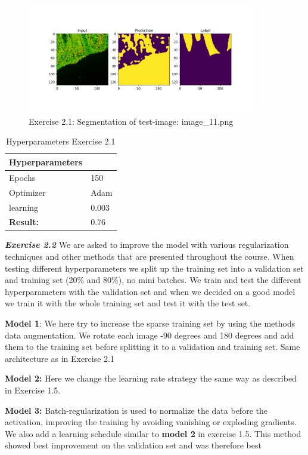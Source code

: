 \documentclass[a4paper,10pt]{article}
\begin{document}
\begin{figure}[ht!]
\centering
\includegraphics[width=100mm]{figures/assignment_3/segmentation_worst.png}
\caption{Exercise 2.1: Segmentation of test-image: image\_11.png}
\label{fig:worst}
\end{figure}

\begin{table}[ht!]
\centering
\begin{tabular}{ll}\hline 
 \textbf{Hyperparameters}&    \\ \hline
 Epochs&  150 \\ 
 Optimizer& Adam  \\
 learning& 0.003 \\ \hline
\textbf{Result: }&   0.76 \\ \hline
\end{tabular}
\caption{Hyperparameters Exercise 2.1}
\label{tab:tab8}
\end{table}

\textit{\textbf{Exercise 2.2}} We are asked to improve the model with various regularization techniques and other methods that are presented throughout the course. When testing different hyperparameters we split up the training set into a validation set and training set (20\% and 80\%), no mini batches. We train and test the different hyperparameters with the validation set and when we decided on a good model we train it with the whole training set and test it with the test set. 


\textbf{Model 1}: We here try to increase the sparse training set by using the methods data augmentation. We rotate each image -90 degrees and 180 degrees and add them to the training set before splitting it to a validation and training set. Same architecture as in Exercise 2.1 

\textbf{Model 2:} Here we change the learning rate strategy the same way as described in Exercise 1.5.
   

\textbf{Model 3:} Batch-regularization is used to normalize the data before the activation, improving the training by avoiding vanishing or exploding gradients. We also add a learning schedule similar to \textbf{model 2} in exercise 1.5. This method showed best improvement on the validation set and was therefore best 
\end{document}
